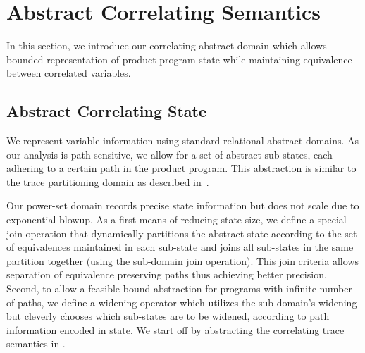 \section{Abstract Correlating Semantics}

In this section, we introduce our correlating abstract domain which allows bounded representation of product-program state while maintaining equivalence between correlated variables.

\subsection{Abstract Correlating State}

We represent variable information using standard relational abstract domains. As our analysis is path sensitive, we allow for a set of abstract sub-states, each adhering to a certain path in the product program. This abstraction is similar to the trace partitioning domain as described in~\cite{MauborgneRival07}.

Our power-set domain records precise state information but does not scale due to exponential blowup. As a first means of reducing state size, we define a special join operation that dynamically partitions the abstract state according to the set of equivalences maintained in each sub-state and joins all sub-states in the same partition together (using the sub-domain join operation). This join criteria allows separation of equivalence preserving paths thus achieving better precision. Second, to allow a feasible bound abstraction for programs with infinite number of paths, we define a widening operator which utilizes the sub-domain's widening but cleverly chooses which sub-states are to be widened, according to path information encoded in state.
We start off by abstracting the correlating trace semantics in .

